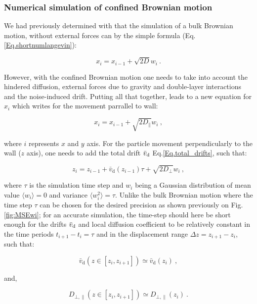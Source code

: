 \subsubsection{Numerical simulation of confined Brownian motion}

We had previously determined with that the simulation of a bulk Brownian motion, without external forces can by the simple formula (Eq.\ref{Eq.shortnumlangevin}): 

\begin{equation}
	x_i = x_{i-1} + \sqrt{2D}w_i~.
\end{equation}

However, with the confined Brownian motion one needs to take into account the hindered diffusion, external forces due to gravity and double-layer interactions and the noise-induced drift. Putting all that together, leads to a new equation for $x_i$ which writes for the movement parrallel to wall:

\begin{equation}
	x_i = x_{i-1} +  \sqrt{2D_\parallel}w_i ~,
\end{equation}

where $i$ represents $x$ and $y$ axis. For the particle movement perpendicularly to the wall ($z$ axis), one needs to add the total drift $\bar{v}_\textnormal{d}$ Eq.\ref{Eq.total_drifts}, such that:

\begin{equation}
	z_i = z_{i-1} + \bar{v}_\mathrm{d}(z_{i-1}) \tau + \sqrt{2D_\bot}w_i ~,
\end{equation}

where $\tau$ is the simulation time step and $w_i$ being a Gaussian distribution of mean value $\langle w_i \rangle = 0$ and variance $\langle w_i ^2\rangle = \tau$. Unlike the bulk Brownian motion where the time step $\tau$ can be chosen for the desired precision as shown previously on Fig.\ref{fig:MSEwi}; for an accurate simulation, the time-step should here be short enough for the drifts $\bar{v}_\textnormal{d}$ and local diffusion coefficient to be relatively constant in the time periods $t_{i+1} - t_i = \tau$ and in the displacement range $\Delta z = z_{i+1} - z_i$, such that:

\begin{equation}
	\bar{v}_\mathrm{d} (z \in [z_i, z_{i+1}]) \simeq \bar{v}_\mathrm{d} (z_i) ~,
	\label{driftc}
\end{equation}

and,

\begin{equation}
	D_{\bot, \parallel}(z \in [z_i, z_{i+1}]) \simeq D_{\bot, \parallel}(z_i) ~.
\end{equation}

